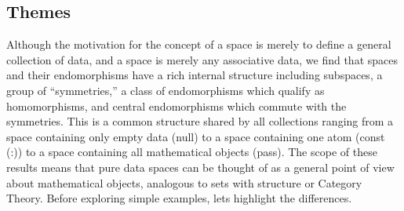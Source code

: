 \documentclass[11pt]{article}
\begin{document}
\subsection{Themes}

Although the motivation for the concept of a space is merely to define a general collection of data, and a space is merely any associative data, we 
find that spaces and their endomorphisms have a rich internal structure including subspaces, a group of ``symmetries,'' a class of endomorphisms which 
qualify as homomorphisms, and central endomorphisms which commute with the symmetries.  This is a common structure shared by all collections ranging 
from a space containing only empty data (null) to a space containing one atom (const (:)) to a space containing all mathematical objects (pass).  
The scope of these results means that pure data spaces can be thought of as a general point of view about mathematical objects, analogous to
sets with structure or Category Theory.  Before exploring simple examples, lets highlight the differences. 
\end{document}
